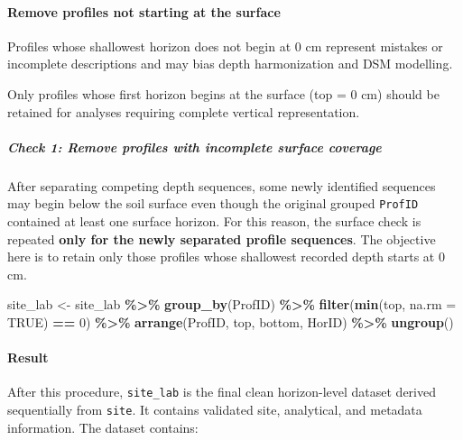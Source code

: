 \documentclass[
  10pt,
  b5paper,
  oneside]{book}
\newenvironment{Shaded}{\begin{snugshade}}{\end{snugshade}}
\newcommand{\AttributeTok}[1]{\textcolor[rgb]{0.13,0.29,0.53}{#1}}
\newcommand{\ConstantTok}[1]{\textcolor[rgb]{0.56,0.35,0.01}{#1}}
\newcommand{\DecValTok}[1]{\textcolor[rgb]{0.00,0.00,0.81}{#1}}
\newcommand{\FunctionTok}[1]{\textcolor[rgb]{0.13,0.29,0.53}{\textbf{#1}}}
\newcommand{\NormalTok}[1]{#1}
\newcommand{\OtherTok}[1]{\textcolor[rgb]{0.56,0.35,0.01}{#1}}
\newcommand{\SpecialCharTok}[1]{\textcolor[rgb]{0.81,0.36,0.00}{\textbf{#1}}}
\begin{document}
\paragraph*{Remove profiles not starting at the surface}\label{remove-profiles-not-starting-at-the-surface}

Profiles whose shallowest horizon does not begin at 0 cm represent mistakes or incomplete descriptions and may bias depth harmonization and DSM modelling.

Only profiles whose first horizon begins at the surface (top = 0 cm) should be retained for analyses requiring complete vertical representation.

\subparagraph*{Check 1: Remove profiles with incomplete surface coverage}\label{check-1-remove-profiles-with-incomplete-surface-coverage}

After separating competing depth sequences, some newly identified sequences may begin below the soil surface even though the original grouped \texttt{ProfID} contained at least one surface horizon. For this reason, the surface check is repeated \textbf{only for the newly separated profile sequences}. The objective here is to retain only those profiles whose shallowest recorded depth starts at 0 cm.

\begin{Shaded}
\begin{Highlighting}[]
\NormalTok{site\_lab }\OtherTok{\textless{}{-}}\NormalTok{ site\_lab }\SpecialCharTok{\%\textgreater{}\%}
  \FunctionTok{group\_by}\NormalTok{(ProfID) }\SpecialCharTok{\%\textgreater{}\%}
  \FunctionTok{filter}\NormalTok{(}\FunctionTok{min}\NormalTok{(top, }\AttributeTok{na.rm =} \ConstantTok{TRUE}\NormalTok{) }\SpecialCharTok{==} \DecValTok{0}\NormalTok{) }\SpecialCharTok{\%\textgreater{}\%}   
  \FunctionTok{arrange}\NormalTok{(ProfID, top, bottom, HorID) }\SpecialCharTok{\%\textgreater{}\%}
  \FunctionTok{ungroup}\NormalTok{()}
\end{Highlighting}
\end{Shaded}

\paragraph{Result}\label{result}

After this procedure, \texttt{site\_lab} is the final clean horizon-level dataset derived sequentially from \texttt{site}. It contains validated site, analytical, and metadata information. The dataset contains:
\end{document}
